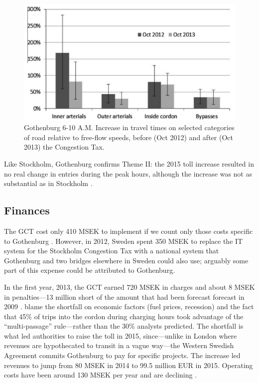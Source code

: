 \begin{figure}[ht]
\includegraphics[width=0.55\columnwidth]{../img/gburg-travel-times.png}

\caption{Gothenburg 6-10 A.M. Increase in travel times on selected categories of road relative to free-flow speeds, before (Oct 2012) and after (Oct 2013) the Congestion Tax. \citep{Borjesson2015} \label{fig:Gothenburg-travel-times}}

\end{figure}

Like Stockholm, Gothenburg confirms Theme II: the 2015 toll increase resulted in no real change in entries during the peak hours, although the increase was not as substantial as in Stockholm \citep[p. 43, Tab. 6]{Borjesson2018}.

\subsection{Finances}

The GCT cost only 410 MSEK to implement if we count only those costs specific to Gothenburg \citep[p. 40]{Borjesson2018}. However, in 2012, Sweden spent 350 MSEK to replace the IT system for the Stockholm Congestion Tax with a national system that Gothenburg and two bridges elsewhere in Sweden could also use; arguably some part of this expense could be attributed to Gothenburg. 

In the first year, 2013, the GCT earned 720 MSEK in charges and about 8 MSEK in penalties---13 million short of the amount that had been forecast forecast in 2009 \citep[pp. 142-143]{Borjesson2015}. \citet{Borjesson2015} blame the shortfall on economic factors (fuel prices, recession) and the fact that 45\% of trips into the cordon during charging hours took advantage of the ``multi-passage'' rule---rather than the 30\% analysts predicted. The shortfall is what led authorities to raise the toll in 2015, since---unlike in London where revenues are hypothecated to transit in a vague way---the Western Swedish Agreement commits Gothenburg to pay for specific projects. The increase led revenues to jump from 80 MSEK in 2014 to 99.5 million EUR in 2015. Operating costs have been around 130 MSEK per year and are declining \citep[table 3]{Borjesson2018}.




